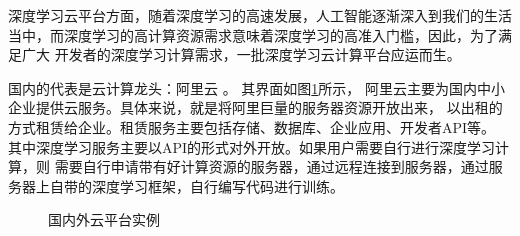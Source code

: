 深度学习云平台方面，随着深度学习的高速发展，人工智能逐渐深入到我们的生活当中，而深度学习的高计算资源需求意味着深度学习的高准入门槛，因此，为了满足广大
开发者的深度学习计算需求，一批深度学习云计算平台应运而生。

国内的代表是云计算龙头：阿里云  \cite{aliyun}。
其界面如图\ref{fig:cloud_platform}所示，
阿里云主要为国内中小企业提供云服务。具体来说，就是将阿里巨量的服务器资源开放出来，
以出租的方式租赁给企业。租赁服务主要包括存储、数据库、企业应用、开发者API等。
其中深度学习服务主要以API的形式对外开放。如果用户需要自行进行深度学习计算，则
需要自行申请带有好计算资源的服务器，通过远程连接到服务器，通过服务器上自带的深度学习框架，自行编写代码进行训练。

\begin{figure}[h]
    \centering
    \caption{国内外云平台实例}
    \label{fig:cloud_platform}
\end{figure}


